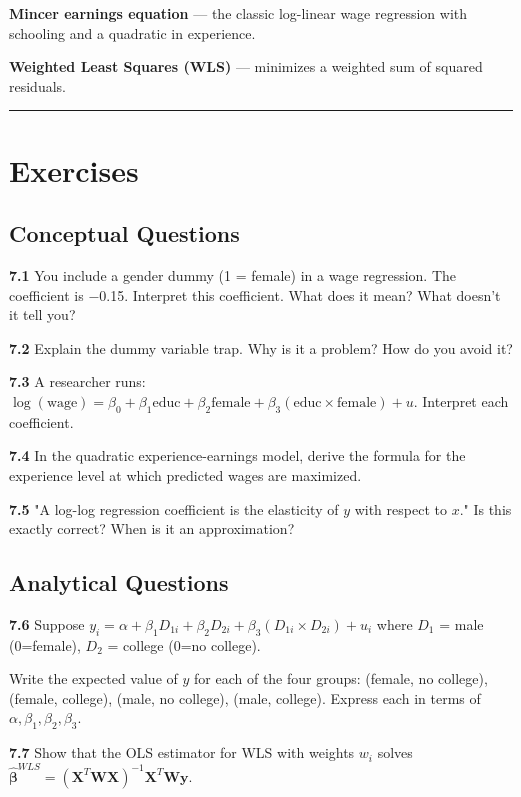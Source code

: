 \textbf{Mincer earnings equation} --- the classic log-linear wage regression with schooling and a quadratic in experience.

\textbf{Weighted Least Squares (WLS)} --- minimizes a weighted sum of squared residuals.

\medskip\hrule\medskip

\section{Exercises}

\subsection{Conceptual Questions}

\textbf{7.1} You include a gender dummy (1 = female) in a wage regression. The coefficient is $-$0.15. Interpret this coefficient. What does it mean? What doesn't it tell you?

\textbf{7.2} Explain the dummy variable trap. Why is it a problem? How do you avoid it?

\textbf{7.3} A researcher runs: $\log(\text{wage}) = \beta_0 + \beta_1 \text{educ} + \beta_2 \text{female} + \beta_3 (\text{educ} \times \text{female}) + u$. Interpret each coefficient.

\textbf{7.4} In the quadratic experience-earnings model, derive the formula for the experience level at which predicted wages are maximized.

\textbf{7.5} "A log-log regression coefficient is the elasticity of $y$ with respect to $x$." Is this exactly correct? When is it an approximation?

\subsection{Analytical Questions}

\textbf{7.6} Suppose $y_i = \alpha + \beta_1 D_{1i} + \beta_2 D_{2i} + \beta_3 (D_{1i} \times D_{2i}) + u_i$ where $D_1$ = male (0=female), $D_2$ = college (0=no college). 

Write the expected value of $y$ for each of the four groups: (female, no college), (female, college), (male, no college), (male, college). Express each in terms of $\alpha, \beta_1, \beta_2, \beta_3$.

\textbf{7.7} Show that the OLS estimator for WLS with weights $w_i$ solves $\hat{\boldsymbol{\beta}}^{WLS} = (\mathbf{X}^T\mathbf{W}\mathbf{X})^{-1}\mathbf{X}^T\mathbf{W}\mathbf{y}$.

